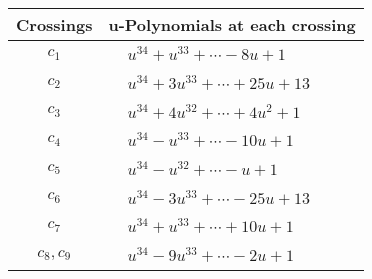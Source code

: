 \documentclass[1p]{elsarticle_modified}
\theoremstyle{definition}
\begin{document}
\begin{tabular}{m{50pt}|m{274pt}}
Crossings & \hspace{64pt}u-Polynomials at each crossing \\
\hline $$\begin{aligned}c_{1}\end{aligned}$$&$\begin{aligned}
&u^{34}+u^{33}+\cdots-8 u+1
\end{aligned}$\\
\hline $$\begin{aligned}c_{2}\end{aligned}$$&$\begin{aligned}
&u^{34}+3 u^{33}+\cdots+25 u+13
\end{aligned}$\\
\hline $$\begin{aligned}c_{3}\end{aligned}$$&$\begin{aligned}
&u^{34}+4 u^{32}+\cdots+4 u^2+1
\end{aligned}$\\
\hline $$\begin{aligned}c_{4}\end{aligned}$$&$\begin{aligned}
&u^{34}- u^{33}+\cdots-10 u+1
\end{aligned}$\\
\hline $$\begin{aligned}c_{5}\end{aligned}$$&$\begin{aligned}
&u^{34}- u^{32}+\cdots- u+1
\end{aligned}$\\
\hline $$\begin{aligned}c_{6}\end{aligned}$$&$\begin{aligned}
&u^{34}-3 u^{33}+\cdots-25 u+13
\end{aligned}$\\
\hline $$\begin{aligned}c_{7}\end{aligned}$$&$\begin{aligned}
&u^{34}+u^{33}+\cdots+10 u+1
\end{aligned}$\\
\hline $$\begin{aligned}c_{8},c_{9}\end{aligned}$$&$\begin{aligned}
&u^{34}-9 u^{33}+\cdots-2 u+1
\end{aligned}$\\

\end{tabular}
\end{document}
